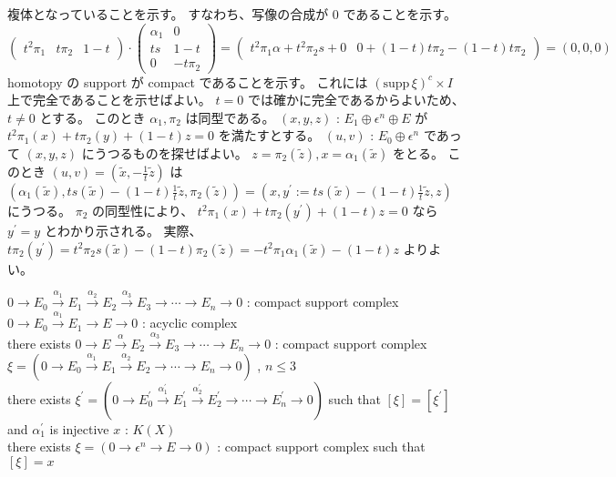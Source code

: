 \documentclass[dvipdfmx]{jsarticle}
\begin{document}
\begin{Proof}
\itemthen
  複体となっていることを示す。
  すなわち、写像の合成が \(0\) であることを示す。
  \[
    \begin{pmatrix}
      t^2 \pi_1 & t \pi_2 & 1 - t
    \end{pmatrix} \cdot \begin{pmatrix}
      \alpha_1 & 0\\
      t s & 1 - t \\
      0 & - t \pi_2
    \end{pmatrix} =
    \begin{pmatrix}
      t^2 \pi_1 \alpha + t^2 \pi_2 s + 0 & 0 + (1-t) t \pi_2 - (1-t) t \pi_2
    \end{pmatrix} = (0,0,0)
  \]
\itemthen
  homotopy の support が compact であることを示す。
  これには \((\text{supp} \, \xi)^c \times I\) 上で完全であることを示せばよい。
  \(t=0\) では確かに完全であるからよいため、 \(t \not = 0\) とする。
  このとき \(\alpha_1 , \pi_2\) は同型である。
  \((x,y,z)\) : \(E_1 \oplus \epsilon^n \oplus E\) が \(t^2 \pi_1(x) + t \pi_2(y) + (1-t) z = 0\) を満たすとする。
  \((u,v)\) : \(E_0 \oplus \epsilon^n\) であって \((x,y,z)\) にうつるものを探せばよい。
  \(z = \pi_2(\tilde{z}) , x = \alpha_1(\tilde{x})\) をとる。
  このとき \((u,v) = (\tilde{x} , - \frac{1}{t} \tilde{z})\) は \((\alpha_1(\tilde{x}) , t s(\tilde{x}) - (1-t) \frac{1}{t} \tilde{z} , \pi_2(\tilde{z})) = (x , y^\prime := t s(\tilde{x}) - (1-t) \frac{1}{t} \tilde{z} , z)\) にうつる。
  \(\pi_2\) の同型性により、 \(t^2 \pi_1(x) + t \pi_2(y^\prime) + (1-t) z = 0\) なら \(y^\prime = y\) とわかり示される。
  実際、 \(t \pi_2(y^\prime) = t^2 \pi_2 s(\tilde{x}) - (1-t) \pi_2(\tilde{z}) = - t^2 \pi_1 \alpha_1 (\tilde{x}) - (1-t) z\) よりよい。
\end{Proof}


\begin{Theorem}
\itemprop
  \For \(0 \to E_0 \overset{\alpha_1}{\to} E_1 \overset{\alpha_2}{\to} E_2 \overset{\alpha_3}{\to} E_3 \to \cdots \to E_n \to 0\) : compact support complex \\
  \For \(0 \to E_0 \overset{\alpha_1}{\to} E_1 \to E \to 0\) : acyclic complex \\
  \Then there exists \(0 \to E \overset{\alpha}{\to} E_2 \overset{\alpha_3}{\to} E_3 \to \cdots \to E_n \to 0\) : compact support complex
\itemprop
  \For \(\xi = (0 \to E_0 \overset{\alpha_1}{\to} E_1 \overset{\alpha_2}{\to} E_2 \to \cdots \to E_n \to 0)\) , \(n \leq 3\) \\
  \Then there exists \(\xi^\prime = (0 \to E^\prime_0 \overset{\alpha^\prime_1}{\to} E^\prime_1 \overset{\alpha^\prime_2}{\to} E^\prime_2 \to \cdots \to E^\prime_n \to 0)\) such that \([\xi] = [\xi^\prime]\) and \(\alpha^\prime_1\) is injective
\itemprop
  \For \(x\) : \(K(X)\) \\
  \Then there exists \(\xi = (0 \to \epsilon^n \to E \to 0)\) : compact support complex such that \([\xi] = x\)
\end{Theorem}
\end{document}
